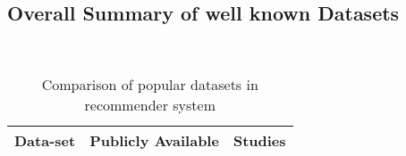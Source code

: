 \subsection{Overall Summary of well known Datasets}
\\
\begin{table}[!htbp] 
\centering
\footnotesize
\def\arraystretch{1.4}%
\centering
\begin{tabular}{|p{2cm}|p{3cm}|p{5cm}|}

\hline
\textbf{Data-set} & \textbf{Publicly Available} & \textbf{Studies }
\\
\hline
\end{tabular}

\caption{Comparison of popular datasets in recommender system}
\label{table:26}
\end{table}
